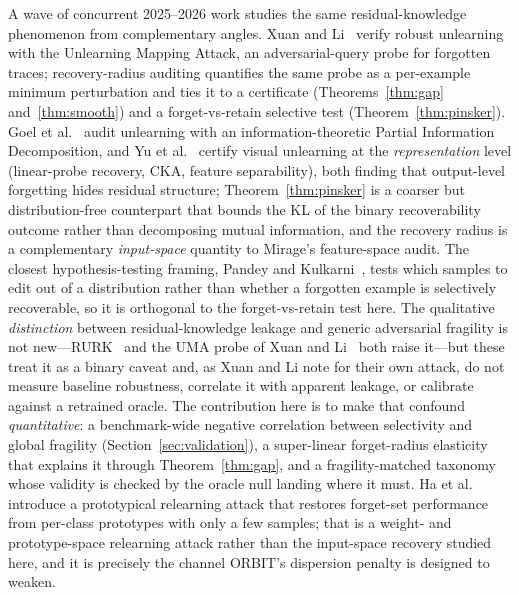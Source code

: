 \documentclass[11pt]{article}
\begin{document}
A wave of concurrent 2025--2026 work studies the same residual-knowledge phenomenon from complementary angles. Xuan and Li~\cite{xuan2025uma} verify robust unlearning with the Unlearning Mapping Attack, an adversarial-query probe for forgotten traces; recovery-radius auditing quantifies the same probe as a per-example minimum perturbation and ties it to a certificate (Theorems~\ref{thm:gap} and~\ref{thm:smooth}) and a forget-vs-retain selective test (Theorem~\ref{thm:pinsker}). Goel et al.~\cite{goel2026pid} audit unlearning with an information-theoretic Partial Information Decomposition, and Yu et al.~\cite{yu2026mirage} certify visual unlearning at the \emph{representation} level (linear-probe recovery, CKA, feature separability), both finding that output-level forgetting hides residual structure; Theorem~\ref{thm:pinsker} is a coarser but distribution-free counterpart that bounds the KL of the binary recoverability outcome rather than decomposing mutual information, and the recovery radius is a complementary \emph{input-space} quantity to Mirage's feature-space audit. The closest hypothesis-testing framing, Pandey and Kulkarni~\cite{pandey2026statistical}, tests which samples to edit out of a distribution rather than whether a forgotten example is selectively recoverable, so it is orthogonal to the forget-vs-retain test here. The qualitative \emph{distinction} between residual-knowledge leakage and generic adversarial fragility is not new---RURK~\cite{hsu2025rurk} and the UMA probe of Xuan and Li~\cite{xuan2025uma} both raise it---but these treat it as a binary caveat and, as Xuan and Li note for their own attack, do not measure baseline robustness, correlate it with apparent leakage, or calibrate against a retrained oracle. The contribution here is to make that confound \emph{quantitative}: a benchmark-wide negative correlation between selectivity and global fragility (Section~\ref{sec:validation}), a super-linear forget-radius elasticity that explains it through Theorem~\ref{thm:gap}, and a fragility-matched taxonomy whose validity is checked by the oracle null landing where it must. Ha et al.~\cite{ha2025prototypical} introduce a prototypical relearning attack that restores forget-set performance from per-class prototypes with only a few samples; that is a weight- and prototype-space relearning attack rather than the input-space recovery studied here, and it is precisely the channel ORBIT's dispersion penalty is designed to weaken.
\end{document}
